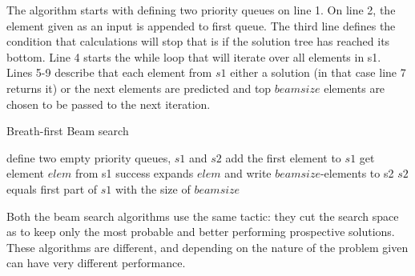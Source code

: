 The algorithm starts with defining two priority queues on line 1. On line 2, the element given as an input is appended to first queue. The third line defines the condition that calculations will stop that is if the solution tree has reached its bottom. Line 4 starts the while loop that will iterate over all elements in s1. Lines 5-9 describe that each element from $s1$ either a solution (in that case line 7 returns it) or the next elements are predicted and top $beamsize$ elements are chosen to be passed to the next iteration.


\begin{algorithm}
 	\caption{Breath-first Beam search}
	\label{alg:breathfirst}
	\begin{algorithmic}[1]
		\State define two empty priority queues, $s1$ and $s2$
		\State add the first element to $s1$
				\State get element $elem$ from s1
					\State	success
					\EndIf
					\State expands $elem$ and write $beamsize$-elements to s2
					\EndWhile
					\State $s2$ equals first part of $s1$ with the size of $beamsize$
					\EndWhile
	\end{algorithmic}
\end{algorithm}




\vspace{0.2 cm}
Both the beam search algorithms use the same tactic: they cut the search space as to keep only the most probable and better performing prospective solutions. These algorithms are different, and depending on the nature of the problem given can have very different performance.







